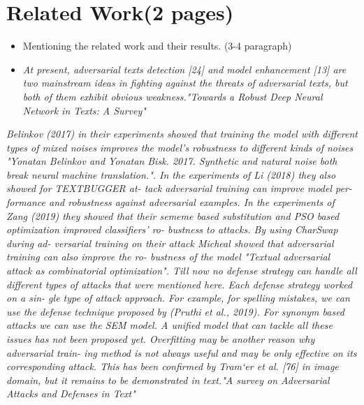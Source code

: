 \documentclass[%
	BCOR=8mm, %
	DIV=12, 
	toc=bibliography, %
	toc=listof, %
	oneside, %
	egregdoesnotlikesansseriftitles, %
	]{scrbook}
\begin{document}







\chapter{Related Work(2 pages)} 
\begin{itemize}
\item Mentioning the related work and their results. (3-4 paragraph) 
\item \textit{At present, adversarial texts detection [24] and model enhancement [13] are two mainstream ideas in fighting against the threats of adversarial texts, but both of them exhibit obvious weakness."Towards a Robust Deep Neural Network in Texts: A Survey"}
\end{itemize}
\textit{Belinkov (2017) in their experiments showed that training the model with different types of mixed noises improves the model’s robustness to different kinds of noises "Yonatan Belinkov and Yonatan Bisk. 2017. Synthetic and natural noise both break neural machine translation.".
 In the experiments of Li (2018) they also showed for TEXTBUGGER at- tack adversarial training can improve model per- formance and robustness against adversarial examples. 
 In the experiments of Zang (2019) they showed that their sememe based substitution and PSO based optimization improved classifiers’ ro- bustness to attacks. By using CharSwap during ad- versarial training on their attack Micheal showed that adversarial training can also improve the ro- bustness of the model "Textual adversarial attack as combinatorial optimization".
Till now no defense strategy can handle all different types of attacks that were mentioned here. Each defense strategy worked on a sin- gle type of attack approach. For example, for spelling mistakes, we can use the defense technique proposed by (Pruthi et al., 2019). For synonym based attacks we can use the SEM model. A unified model that can tackle all these issues has not been proposed yet. \cite{huq_adversarial_2020}
Overfitting may be another reason why adversarial train- ing method is not always useful and may be only effective on its corresponding attack. This has been confirmed by Tram‘er et al. [76] in image domain, but it remains to be demonstrated in text."A survey on Adversarial Attacks and Defenses in Text"}
\end{document}

